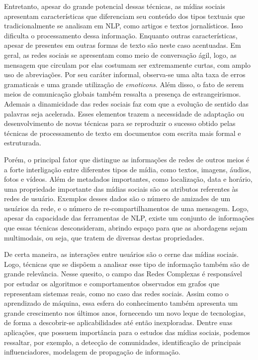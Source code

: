 Entretanto, apesar do grande potencial dessas técnicas, as mídias sociais
apresentam características que diferenciam seu conteúdo dos tipos textuais que
tradicionalmente se analisam em NLP, como artigos e textos jornalísticos.
Isso dificulta o processamento dessa informação.
Enquanto outras características, apesar de presentes em outras formas de texto
são neste caso acentuadas.
Em geral, as redes sociais se apresentam como meio de conversação ágil, logo,
as mensagem que circulam por elas costumam ser extremamente curtas, com amplo
uso de abreviações.
Por seu caráter informal, observa-se uma alta taxa de erros gramaticais e
uma grande utilização de \textit{emoticons}.
Além disso, o fato de serem meios de comunicação globais também ressalta a presença
de estrangeirismos.
Ademais a dinamicidade das redes sociais faz com que a evolução de sentido das
palavras seja acelerada.
Esses elementos trazem a necessidade de adaptação ou desenvolvimento de novas
técnicas para se reproduzir o sucesso obtido pelas técnicas de processamento de
texto em documentos com escrita mais formal e estruturada.

Porém, o principal fator que distingue as informações de redes de outros meios é
a forte interligação entre diferentes tipos de mídia, como textos, imagens,
áudios, fotos e vídeos.
Além de metadados importantes, como localização, data e horário, uma propriedade
importante das mídias sociais são os atributos referentes às redes de usuário.
Exemplos desses dados são o número de amizades de um usuários da rede, e o
número de re-compartilhamentos de uma mensagem.
Logo, apesar da capacidade das ferramentas de NLP, existe um conjunto de
informações que essas técnicas desconsideram, abrindo espaço para que as
abordagens sejam multimodais, ou seja, que tratem de diversas destas
propriedades.

De certa maneira, as interações entre usuários são o cerne das mídias sociais.
Logo, técnicas que se dispõem a analisar esse tipo de informação também são de
grande relevância.
Nesse quesito, o campo das Redes Complexas é responsável por estudar os
algoritmos e comportamentos observados em grafos que representam sistemas reais,
como no caso das redes sociais.
Assim como o aprendizado de máquina, essa esfera do conhecimento também
apresenta um grande crescimento nos últimos anos, fornecendo um novo leque de
tecnologias, de forma a descobrir-se aplicabilidades até então inexploradas.
Dentre suas aplicações, que possuem importância para o estudos das mídias
sociais, podemos ressaltar, por exemplo, a detecção de comunidades, identificação de
principais influenciadores, modelagem de propagação de informação.

